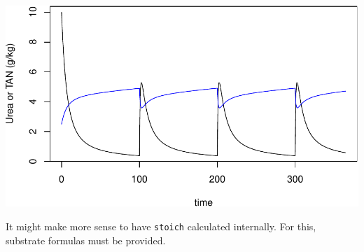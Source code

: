 \documentclass[
]{article}
\begin{document}
\includegraphics{simple_demo_files/figure-latex/unnamed-chunk-76-2.pdf}

It might make more sense to have \texttt{stoich} calculated internally.
For this, substrate formulas must be provided.
\end{document}
